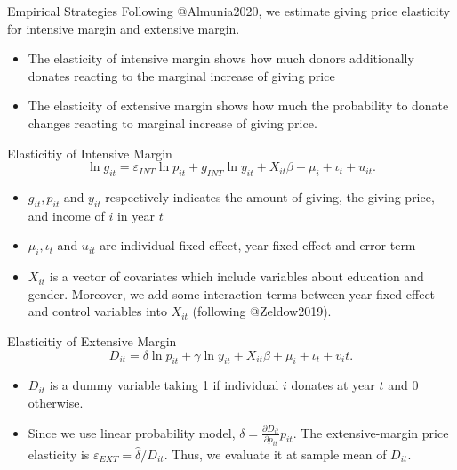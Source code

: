 \documentclass[
  ignorenonframetext,
]{beamer}
\providecommand{\tightlist}{%
  \setlength{\itemsep}{0pt}\setlength{\parskip}{0pt}}
\begin{document}
\begin{frame}{Empirical Strategies}
\protect\hypertarget{empirical-strategies}{}
Following @Almunia2020, we estimate giving price elasticity for intensive margin and extensive margin.

\begin{itemize}
\tightlist
\item
  The elasticity of intensive margin shows how much donors additionally donates reacting to the marginal increase of giving price
\item
  The elasticity of extensive margin shows how much the probability to donate changes reacting to marginal increase of giving price.
\end{itemize}
\end{frame}

\begin{frame}{Elasticitiy of Intensive Margin}
\protect\hypertarget{elasticitiy-of-intensive-margin}{}
\[
\ln g_{it} = \varepsilon_{INT} \ln p_{it} +g_{INT} \ln y_{it} + X_{it}\beta +\mu_i +\iota_t +u_{it}. \label{eq:intensive}
\]

\begin{itemize}
\tightlist
\item
  \(g_{it}, p_{it}\) and \(y_{it}\) respectively indicates the amount of giving, the giving price, and income of \(i\) in year \(t\)
\item
  \(\mu_i, \iota_t\) and \(u_{it}\) are individual fixed effect, year fixed effect and error term
\item
  \(X_{it}\) is a vector of covariates which include variables about education and gender. Moreover, we add some interaction terms between year fixed effect and control variables into \(X_{it}\) (following @Zeldow2019).
\end{itemize}
\end{frame}

\begin{frame}{Elasticitiy of Extensive Margin}
\protect\hypertarget{elasticitiy-of-extensive-margin}{}
\[
D_{it} =  \delta \ln p_{it} +\gamma \ln y_{it} + X_{it}\beta+\mu_i  +\iota_t +v_it. \label{extensive}
\]

\begin{itemize}
\tightlist
\item
  \(D_{it}\) is a dummy variable taking 1 if individual \(i\) donates at year \(t\) and 0 otherwise.
\item
  Since we use linear probability model, \(\delta = \frac{\partial D_{it}}{\partial p_{it}} p_{it}\). The extensive-margin price elasticity is \(\varepsilon_{EXT} = \hat{\delta}/D_{it}\). Thus, we evaluate it at sample mean of \(D_{it}\).
\end{itemize}
\end{frame}
\end{document}
